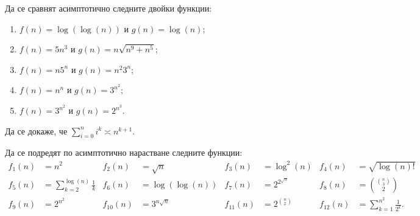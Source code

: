 \begin{problem}
Да се сравнят асимптотично следните двойки функции:
\begin{enumerate}
  \item $f(n) = \log(\log(n))$ и $g(n) = \log(n)$;
  \item $f(n) = 5n^3$ и $g(n) = n \sqrt{n^9 + n^5}$;
  \item $f(n) = n 5^n$ и $g(n) = n^ 2 3^n$;
  \item $f(n) = n^n$ и $g(n) = 3^{n^2}$;
  \item $f(n) = 3^{n^2}$ и $g(n) = 2^{n^3}$.
\end{enumerate}
\end{problem}

\begin{problem}
Да се докаже, че $\sum\limits_{i = 0}^n i^k \asymp n^{k+1}$.
\end{problem}

\begin{problem}
Да се подредят по асимптотично нарастване следните функции:
\begin{align*}
  f_1(n) & = n^2                                       & f_2(n)    & = \sqrt{n}       & f_3(n)    & = \log^2(n)        & f_4(n)    & = \sqrt{\log(n)!}                          \\
  f_5(n) & = \sum\limits_{k = 2}^{\log(n)} \frac{1}{k} & f_6(n)    & = \log(\log(n))  & f_7(n)    & = 2^{2^{\sqrt{n}}} & f_8(n)    & = \binom{\binom{n}{3}}{2}                  \\
  f_9(n) & =2^{n^2}                                    & f_{10}(n) & = 3^{n \sqrt{n}} & f_{11}(n) & =2^{\binom{n}{2}}  & f_{12}(n) & = \sum\limits_{k = 1}^{n^2} \frac{1}{2^k}.
\end{align*}
\end{problem}